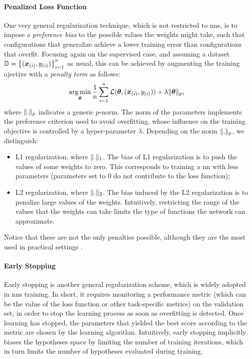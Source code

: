 \paragraph{Penalized Loss Function}
One very general regularization technique, which is not restricted to \glspl{nn}, is to impose a \emph{preference bias} to the possible values the weights might take, such that configurations that generalize achieve a lower training error than configurations that overfit. Focusing again on the supervised case, and assuming a dataset $\Data = \Set{(\PatternVector{x}{i}, \Pattern{y}{i})}_{i=1}^n$ as usual, this can be achieved by augmenting the training ojective with a \emph{penalty term} as follows:
$$\argmin_{\Param} \frac{1}{n} \sum_{i=1}^n \Loss(\Param, (\PatternVector{x}{i}, \Pattern{y}{i})) + \lambda\norm{\Param}_p,$$
where $\mathopen\| . \mathclose\|_p$ indicates a generic $p$-norm. The norm of the parameters implements the preference criterion used to avoid overfitting, whose influence on the training objective is controlled by a hyper-parameter $\lambda$. Depending on the norm $\mathopen\| . \mathclose\|_p$, we distinguish:
\begin{itemize}
    \item L1 regularization, where $\mathopen\| . \mathclose\|_1$. The bias of L1 regularization is to push the values of some weights to zero. This corresponds to training a \gls{nn} with less parameters (parameters set to 0 do not contribute to the loss function);
    \item L2 regularization, where $\mathopen\| . \mathclose\|_2$. The bias induced by the L2 regularization is to penalize large values of the weights. Intuitively, restricting the range of the values that the weights can take limits the type of functions the network can approximate.
\end{itemize}
Notice that these are not the only penalties possible, although they are the most used in practical settings \citep{hastie2009elements}.

\paragraph{Early Stopping}
Early stopping \citep{prechelt1998earlystopping} is another general regularization scheme, which is widely adopted in \glspl{nn} training. In short, it requires monitoring a performance metric (which can be the value of the loss function or other task-specific metrics) on the validation set, in order to stop the learning process as soon as overfitting is detected. Once learning has stopped, the parameters that yielded the best score according to the metric are chosen by the learning algorithm. Intuitively, early stopping implicitly biases the hypotheses space by limiting the number of training iterations, which in turn limits the number of hypotheses evaluated during training.

